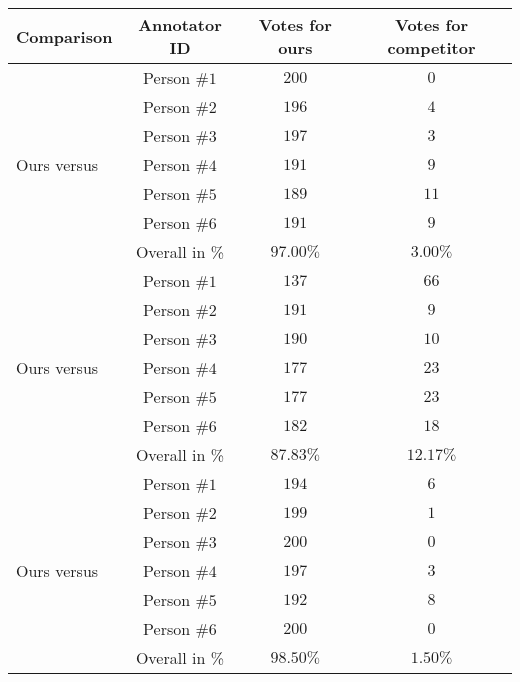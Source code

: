 \documentclass{article}
\begin{document}
\begin{table}
\begin{center}
\begin{tabular}{|l|c|c|c|}
\hline
Comparison                  &                Annotator ID & Votes for ours & Votes for competitor \\
\hline\hline
\multirow{7}{*}{Ours versus~\cite{wang2020arxiv}}  &  Person $\#1$  & $200$ & $0$ \\
                                             &  Person $\#2$  & $196$ & $4$ \\
                                             &  Person $\#3$  & $197$ & $3$ \\         
                                             &  Person $\#4$  & $191$ & $9$ \\  
                                             &  Person $\#5$  & $189$ & $11$ \\ 
                                             &  Person $\#6$  & $191$ &  $9$ \\  
                                             \cline{2-4}
                                             & Overall in \%  & $97.00\%$ & $3.00\%$ \\
\hline                                             
\multirow{7}{*}{Ours versus~\cite{anwar2020arxiv}} &  Person $\#1$  & $137$ & $66$ \\
                                             &  Person $\#2$  & $191$ & $9$ \\
                                             &  Person $\#3$  & $190$ & $10$ \\         
                                             &  Person $\#4$  & $177$ & $23$ \\  
                                             &  Person $\#5$  & $177$ & $23$ \\ 
                                             &  Person $\#6$  & $182$ & $18$ \\  
                                             \cline{2-4}
                                             & Overall in \%  & $87.83\%$ & $12.17\%$ \\
\hline 
\multirow{7}{*}{Ours versus~\cite{huang2021icassp}} &  Person $\#1$  & $194$ & $6$ \\
                                               &  Person $\#2$  & $199$ & $1$ \\
                                               &  Person $\#3$  & $200$ & $0$ \\         
                                               &  Person $\#4$  & $197$ & $3$ \\  
                                               &  Person $\#5$  & $192$ & $8$ \\ 
                                               &  Person $\#6$  & $200$ & $0$ \\  
                                               \cline{2-4}
                                               & Overall in \%  & $98.50\%$ & $1.50\%$ \\
  

\end{tabular}
\end{center}
\end{table}
\end{document}
